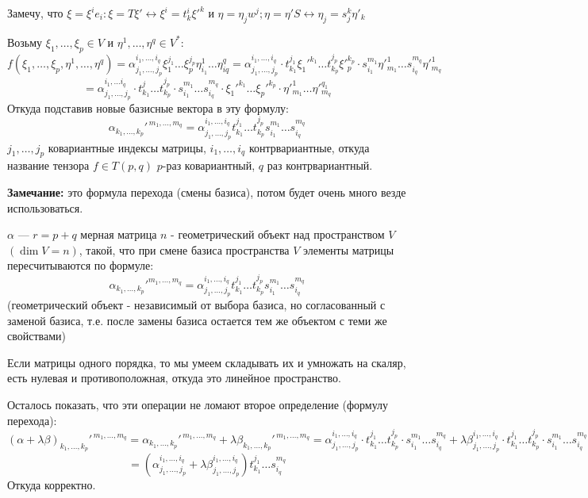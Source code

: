 Замечу, что $\xi =\xi^i e_i: \xi = T \xi' \leftrightarrow \xi^i = t_k^i\xi'^k$
и $\eta = \eta_j w^j; \eta = \eta'S \leftrightarrow \eta_j = s_{j}^k \eta'_k $

Возьму $\xi_1,\ldots,\xi_p \in V$ и $\eta^1,\ldots, \eta^q\in V^*$:
$$f(\xi_1,\ldots,\xi_p,\eta^1,\ldots,\eta^q)=\alpha^{i_1,\ldots,i_q}_{j_1,\ldots, j_p}\xi_1^{j_1}\ldots \xi_{p}^{j_p} \eta_{i_1}^1 \ldots \eta_{iq}^q =\alpha^{i_1,\ldots,i_q}_{j_1,\ldots, j_p} \cdot t_{k_1}^{j_1}\xi_1'^{k_1}\ldots t_{k_p}^{{j_p}}\xi'^{k_p}_p \cdot s_{i_1}^{m_1}\eta'^1_{m_1}\ldots s_{i_q}^{m_q}\eta'^1_{m_q}$$
$$= \alpha^{i_1,\ldots i_q}_{j_1,\ldots, j_p} \cdot t_{k_1}^{j}\ldots t_{k_p}^{j_p}\cdot s_{i_1}^{m_1}\ldots s_{i_q}^{m_q}\cdot \xi_1'^{k_1}\ldots \xi_{p}'^{k_p} \cdot \eta'^{1}_{m_1}\ldots \eta'^{q_1}_{m_q}$$
Откуда подставив новые базисные вектора в эту формулу:
$$\alpha_{k_1,\ldots,k_p}'^{\,m_1,\ldots, m_q} = \alpha_{j_1,\ldots,j_p}^{i_1,\ldots, i_q}t_{k_1}^{j_1}\ldots t_{k_p}^{j_p} s_{i_1}^{m_1}\ldots s_{i_q}^{m_q}$$
$j_1,\ldots, j_p$ ковариантные индексы матрицы, $i_1,\ldots, i_q$ контрвариантные, откуда название тензора $f\in T(p,q)$ $p$-раз ковариантный, $q$ раз контрвариантный.

\textbf{Замечание:} это формула перехода (смены базиса), потом будет очень много везде использоваться.


 $\alpha$ --- $r = p+q$ мерная матрица $n$ - геометрический объект над пространством $V$ $(\dim V =n)$, такой, что при смене базиса пространства $V$ элементы матрицы пересчитываются по формуле:
$$\alpha_{k_1,\ldots,k_p}'^{m_1,\ldots, m_q} = \alpha_{j_1,\ldots,j_p}^{i_1,\ldots, i_q}t_{k_1}^{j_1}\ldots t_{k_p}^{j_p} s_{i_1}^{m_1}\ldots s_{i_q}^{m_q}$$(геометрический объект - независимый от выбора базиса, но согласованный с заменой базиса, т.е. после замены базиса остается тем же объектом с теми же свойствами)

Если матрицы одного порядка, то мы умеем складывать их и умножать на скаляр, есть нулевая и противоположная, откуда это линейное пространство.

Осталось показать, что эти операции не ломают второе определение (формулу перехода):
$$(\alpha + \lambda \beta)_{k_1,\ldots,k_p}'^{\,m_1,\ldots,m_q} = \alpha_{k_1,\ldots,k_p}'^{\, m_1,\ldots, m_q} + \lambda \beta_{k_1,\ldots,k_p}'^{\, m_1,\ldots, m_q} = \alpha_{j_1,\ldots,j_p}^{i_1,\ldots,i_q} \cdot t_{k_1}^{j_1} \ldots t_{k_p}^{j_p}\cdot s_{i_1}^{m_1}\ldots s_{i_q}^{m_q} + \lambda\beta_{j_1,\ldots,j_p}^{i_1,\ldots,i_q} \cdot t_{k_1}^{j_1} \ldots t_{k_p}^{j_p}\cdot s_{i_1}^{m_1}\ldots s_{i_q}^{m_q} $$
$$= (\alpha_{j_1,\ldots, j_p}^{i_1,\ldots,i_q} + \lambda \beta_{j_1,\ldots, j_p}^{i_1,\ldots,i_q})t_{k_1}^{j_1}\ldots s_{i_q}^{m_q}$$
Откуда корректно.

